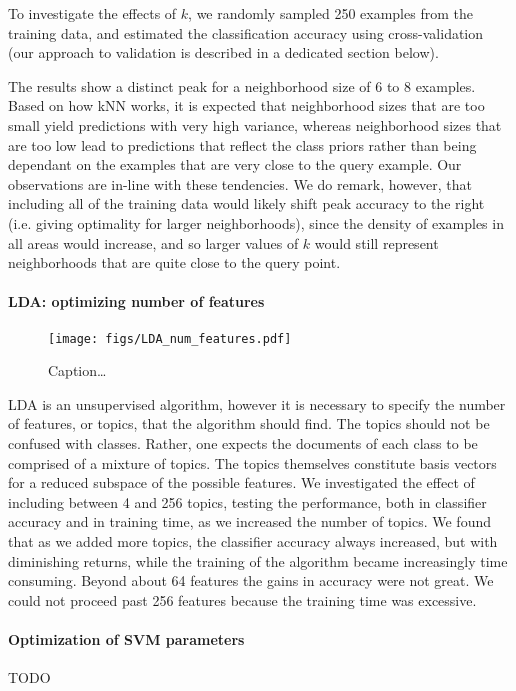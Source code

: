 \documentclass[conference,letterpaper]{IEEEtran}
\begin{document}
To investigate the effects of $k$, we randomly sampled 250 examples from the
training data, and estimated the classification accuracy using 
cross-validation (our approach to validation is described in a dedicated 
section below).  

The results show a distinct peak for a neighborhood size of 6 to 8 examples.
Based on how kNN works, it is expected that neighborhood sizes that are 
too small yield predictions with very high variance, whereas neighborhood 
sizes that are too low lead to predictions that reflect the class priors
rather than being dependant on the examples that are very close to the query 
example.  Our 
observations are in-line with these tendencies.  We do remark, however, that
including all of the training data would likely shift peak accuracy to the
right (i.e. giving optimality for larger neighborhoods), since the density
of examples in all areas would increase, and so larger values of $k$ would 
still represent neighborhoods that are quite close to the query point.



\paragraph*{LDA: optimizing number of features}

\begin{figure}
	\centering
	\texttt{[image: figs/LDA\_num\_features.pdf]}
	\caption{Caption\dots}
	\label{fig:LDA_num_features}
\end{figure}

LDA is an unsupervised algorithm, however it is necessary to specify the 
number of features, or topics, that the algorithm should find.  The topics
should not be confused with classes.  Rather, one expects the documents of 
each class to be comprised of a mixture of topics.  The topics themselves 
constitute basis vectors for a reduced subspace of the possible features.
We investigated the effect of including between 4 and 256 topics, testing the
performance, both in classifier accuracy and in training time, as we increased
the number of topics.  We found that as we added more topics, the classifier
accuracy always increased, but with diminishing returns, while the training
of the algorithm became increasingly time consuming.  Beyond about 64 features
the gains in accuracy were not great.  We could not proceed past 256 features
because the training time was excessive.


\paragraph{Optimization of SVM parameters}
TODO
\end{document}
